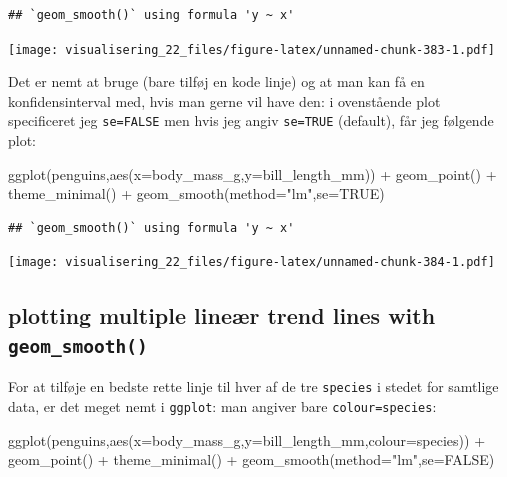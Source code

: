 \documentclass[
]{book}
\newenvironment{Shaded}{\begin{snugshade}}{\end{snugshade}}
\newcommand{\AttributeTok}[1]{\textcolor[rgb]{0.77,0.63,0.00}{#1}}
\newcommand{\ConstantTok}[1]{\textcolor[rgb]{0.00,0.00,0.00}{#1}}
\newcommand{\FunctionTok}[1]{\textcolor[rgb]{0.00,0.00,0.00}{#1}}
\newcommand{\NormalTok}[1]{#1}
\newcommand{\SpecialCharTok}[1]{\textcolor[rgb]{0.00,0.00,0.00}{#1}}
\newcommand{\StringTok}[1]{\textcolor[rgb]{0.31,0.60,0.02}{#1}}
\begin{document}
\begin{verbatim}
## `geom_smooth()` using formula 'y ~ x'
\end{verbatim}

\texttt{[image: visualisering\_22\_files/figure-latex/unnamed-chunk-383-1.pdf]}

Det er nemt at bruge (bare tilføj en kode linje) og at man kan få en konfidensinterval med, hvis man gerne vil have den: i ovenstående plot specificeret jeg \texttt{se=FALSE} men hvis jeg angiv \texttt{se=TRUE} (default), får jeg følgende plot:

\begin{Shaded}
\begin{Highlighting}[]
\FunctionTok{ggplot}\NormalTok{(penguins,}\FunctionTok{aes}\NormalTok{(}\AttributeTok{x=}\NormalTok{body\_mass\_g,}\AttributeTok{y=}\NormalTok{bill\_length\_mm)) }\SpecialCharTok{+} 
  \FunctionTok{geom\_point}\NormalTok{() }\SpecialCharTok{+} 
  \FunctionTok{theme\_minimal}\NormalTok{() }\SpecialCharTok{+} 
  \FunctionTok{geom\_smooth}\NormalTok{(}\AttributeTok{method=}\StringTok{"lm"}\NormalTok{,}\AttributeTok{se=}\ConstantTok{TRUE}\NormalTok{)}
\end{Highlighting}
\end{Shaded}

\begin{verbatim}
## `geom_smooth()` using formula 'y ~ x'
\end{verbatim}

\texttt{[image: visualisering\_22\_files/figure-latex/unnamed-chunk-384-1.pdf]}

\hypertarget{plotting-multiple-lineuxe6r-trend-lines-with-geom_smooth}{%
\subsection{\texorpdfstring{plotting multiple lineær trend lines with \texttt{geom\_smooth()}}{plotting multiple lineær trend lines with geom\_smooth()}}\label{plotting-multiple-lineuxe6r-trend-lines-with-geom_smooth}}

For at tilføje en bedste rette linje til hver af de tre \texttt{species} i stedet for samtlige data, er det meget nemt i \texttt{ggplot}: man angiver bare \texttt{colour=species}:

\begin{Shaded}
\begin{Highlighting}[]
\FunctionTok{ggplot}\NormalTok{(penguins,}\FunctionTok{aes}\NormalTok{(}\AttributeTok{x=}\NormalTok{body\_mass\_g,}\AttributeTok{y=}\NormalTok{bill\_length\_mm,}\AttributeTok{colour=}\NormalTok{species)) }\SpecialCharTok{+} 
  \FunctionTok{geom\_point}\NormalTok{() }\SpecialCharTok{+} 
  \FunctionTok{theme\_minimal}\NormalTok{() }\SpecialCharTok{+} 
  \FunctionTok{geom\_smooth}\NormalTok{(}\AttributeTok{method=}\StringTok{"lm"}\NormalTok{,}\AttributeTok{se=}\ConstantTok{FALSE}\NormalTok{)}
\end{Highlighting}
\end{Shaded}
\end{document}
